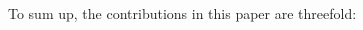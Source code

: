 \documentclass[10pt,twocolumn,letterpaper]{article}
\newcommand\xw[1]{{\footnotesize \color{red}[#1 - \textbf{Xiaofang}]}}
\newcommand\xw[1]{}
\begin{document}
\begin{CJK*}{UTF8}{gkai}

To sum up, the contributions in this paper are threefold: 


\end{CJK*}
\end{document}

